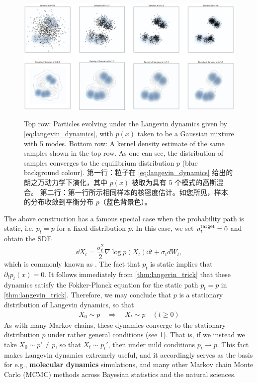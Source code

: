 \begin{figure}[!t]
    \centering
    \includegraphics[width=\textwidth]{figures/langevin.png}
    \label{fig:langevin}
    \caption{
        Top row: Particles evolving under the Langevin dynamics given by \cref{eq:langevin_dynamics}, with $p(x)$ taken to be a Gaussian mixture with 5 modes. 
        Bottom row: A kernel density estimate of the same samples shown in the top row. 
        As one can see, the distribution of samples converges to the equilibrium distribution $p$ (blue background colour).
        第一行：粒子在 \cref{eq:langevin_dynamics} 给出的朗之万动力学下演化，其中 $p(x)$ 被取为具有 5 个模式的高斯混合。
        第二行：第一行所示相同样本的核密度估计。如您所见，样本的分布收敛到平衡分布 $p$（蓝色背景色）。
    } 
\end{figure}
\begin{remarkbox}
The above construction has a famous special case when the probability path is static, i.e. $p_t=p$ for a fixed distribution $p$. In this case, we set $u^{\text{target}}_t=0$ and obtain the SDE
\begin{equation}
    \dd X_t = \frac{\sigma_t^2}{2}\nabla\log p(X_t)\dd t + \sigma_t dW_t \label{eq:langevin_dynamics},
\end{equation}
which is commonly known as . The fact that $p_t$ is static implies that $\partial_tp_t(x)=0$. It follows immediately from \cref{thm:langevin_trick} that these dynamics satisfy the Fokker-Planck equation for the static path $p_t=p$ in \cref{thm:langevin_trick}. Therefore, we may conclude that $p$ is a stationary distribution of Langevin dynamics, so that
\begin{align*}
    X_0 \sim p\quad \Rightarrow \quad X_t \sim p\quad (t\geq 0)
\end{align*}
As with many Markov chains, these dynamics converge to the stationary distribution $p$ under rather general conditions (see \cref{fig:langevin}). That is, if we instead we take $X_0 \sim p' \neq p$, so that $X_t \sim p_t'$, then under mild conditions $p_t \to p$. This fact makes Langevin dynamics extremely useful, and it accordingly serves as the basis for e.g., \textbf{molecular dynamics} simulations, and many other Markov chain Monte Carlo (MCMC) methods across Bayesian statistics and the natural sciences.
\end{remarkbox}

